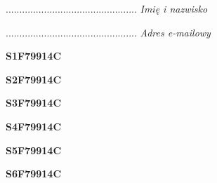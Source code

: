 \begin{turn}{90}\begin{minipage}{\linewidth} \vspace{20mm} ................................................  \textit{Imię i nazwisko}\end{minipage}\end{turn}

\begin{turn}{90}\begin{minipage}{\linewidth} \vspace{20mm} ................................................  \textit{Adres e-mailowy}\end{minipage}\end{turn}

\begin{turn}{90}\huge \begin{minipage}{\linewidth} \vspace{10mm}\textbf{S1F79914C}\end{minipage}\end{turn}

\begin{turn}{90}\huge \begin{minipage}{\linewidth} \vspace{10mm}\textbf{S2F79914C}\end{minipage}\end{turn}

\begin{turn}{90}\huge \begin{minipage}{\linewidth} \vspace{10mm}\textbf{S3F79914C}\end{minipage}\end{turn}

\begin{turn}{90}\huge \begin{minipage}{\linewidth} \vspace{10mm}\textbf{S4F79914C}\end{minipage}\end{turn}

\begin{turn}{90}\huge \begin{minipage}{\linewidth} \vspace{10mm}\textbf{S5F79914C}\end{minipage}\end{turn}

\begin{turn}{90}\huge \begin{minipage}{\linewidth} \vspace{10mm}\textbf{S6F79914C}\end{minipage}\end{turn}


